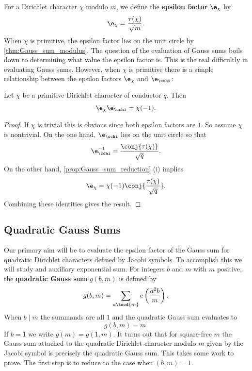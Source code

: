 \documentclass[12pt]{article}
\begin{document}
      For a Dirichlet character \(\chi\) modulo \(m\), we define the \textbf{epsilon factor} \(\e_{\chi}\) by
      \[
        \e_{\chi} = \frac{\tau(\chi)}{\sqrt{m}}.
      \]
      When \(\chi\) is primitive, the epsilon factor lies on the unit circle by \cref{thm:Gauss_sum_modulus}. The question of the evaluation of Gauss sums boils down to determining what value the epsilon factor is. This is the real difficultly in evaluating Gauss sums. However, when \(\chi\) is primitive there is a simple relationship between the epsilon factors \(\e_{\chi}\) and \(\e_{\cchi}\):

      \begin{proposition}\label{prop:epsilon_factor_relationship}
        Let \(\chi\) be a primitive Dirichlet character of conductor \(q\). Then
        \[
          \e_{\chi}\e_{\cchi} = \chi(-1).
        \]
      \end{proposition}
      \begin{proof}
        If \(\chi\) is trivial this is obvious since both epsilon factors are \(1\). So assume \(\chi\) is nontrivial. On the one hand, \(\e_{\cchi}\) lies on the unit circle so that
        \[
          \e_{\cchi}^{-1} = \frac{\conj{\tau(\chi)}}{{\sqrt{q}}}.
        \]
        On the other hand, \cref{prop:Gauss_sum_reduction} (i) implies
        \[
          \e_{\chi} = \chi(-1)\conj{\frac{\tau(\chi)}{\sqrt{q}}}.
        \]
        Combining these identities gives the result.
      \end{proof}
    \subsection{Quadratic Gauss Sums}
      Our primary aim will be to evaluate the epsilon factor of the Gauss sum for quadratic Dirichlet characters defined by Jacobi symbols. To accomplish this we will study and auxiliary exponential sum. For integers \(b\) and \(m\) with \(m\) positive, the \textbf{quadratic Gauss sum} \(g(b,m)\) is defined by
      \[
        g(b,m) = \sum_{a \tmod{m}}e\left(\frac{a^{2}b}{m}\right).
      \]
      When \(b \mid m\) the summands are all \(1\) and the quadratic Gauss sum evaluates to
      \[
        g(b,m) = m.
      \]
      If \(b = 1\) we write \(g(m) = g(1,m)\). It turns out that for square-free \(m\) the Gauss sum attached to the quadratic Dirichlet character modulo \(m\) given by the Jacobi symbol is precisely the quadratic Gauss sum. This takes some work to prove. The first step is to reduce to the case when \((b,m) = 1\).
\end{document}
